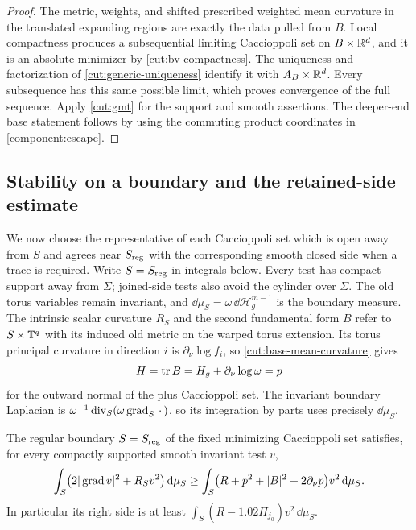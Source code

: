 \begin{proof}
The metric, weights, and shifted prescribed weighted mean curvature in the translated expanding
regions are exactly the data pulled from $B$.  Local compactness
produces a subsequential limiting Caccioppoli set on $B\times\mathbb R^d$, and it is
an absolute minimizer by \cref{cut:bv-compactness}.  The uniqueness and
factorization of \cref{cut:generic-uniqueness} identify it with
$A_B\times\mathbb R^d$.  Every subsequence has this same possible limit, which
proves convergence of the full sequence.  Apply \cref{cut:gmt} for the
support and smooth assertions.  The deeper-end base statement follows by
using the commuting product coordinates in \cref{component:escape}.
\end{proof}

\subsection{Stability on a boundary and the retained-side estimate}

We now choose the representative of each Caccioppoli set which is open away from
$S$ and agrees near $S_{\rm reg}$ with the corresponding smooth closed
side when a trace is required.  Write $S=S_{\rm reg}$ in integrals below.
Every test has compact support away from $\Sigma$; joined-side tests
also avoid the cylinder over $\Sigma$.  The old torus variables remain
invariant, and $\dd\mu_S=\omega\,\dd\mathcal H_g^{m-1}$ is the boundary
measure.  The intrinsic scalar curvature $R_S$ and the second
fundamental form $B$ refer to $S\times\mathbb T^q$ with its induced old
metric on the warped torus extension.  Its torus principal curvature in direction $i$ is
$\partial_\nu\log f_i$, so \eqref{cut:base-mean-curvature} gives
\[
          H=\operatorname{tr} B=H_g+\partial_\nu\log\omega=p
\]
for the outward normal of the plus Caccioppoli set.  The invariant boundary Laplacian
is $\omega^{-1}\operatorname{div}_S(\omega\operatorname{grad}_S\,\cdot\,)$, so its integration by
parts uses precisely $\dd\mu_S$.

\begin{lemma}\label{cut:boundary-stability}
The regular boundary $S=S_{\rm reg}$ of the fixed minimizing Caccioppoli set
satisfies, for every compactly supported smooth invariant test $v$,
\begin{equation}\label{cut:boundary-form}
 \int_S\bigl(2|\operatorname{grad} v|^2+R_Sv^2\bigr)\,\mathrm d\mu_S
 \ge\int_S\bigl(R+p^2+|B|^2+2\partial_\nu p\bigr)v^2\,\mathrm d\mu_S.
\end{equation}
In particular its right side is at least
$\int_S(R-1.02\Pi_{j_0})v^2\,\dd\mu_S$.
\end{lemma}

